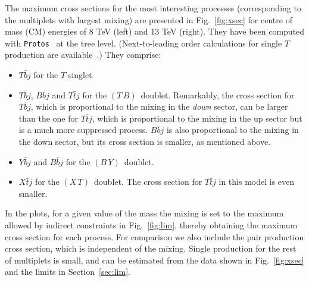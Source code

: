 \documentclass[12pt,a4paper]{article}
\newcommand{\xt}{$(X\,T)$}
\newcommand{\tb}{$(T\,B)$}
\newcommand{\by}{$(B\,Y)$}
\begin{document}
The maximum cross sections for the most interesting processes (corresponding to the multiplets with largest mixing) are presented in Fig.~\ref{fig:xsec} for centre of mass (CM) energies of 8 TeV (left) and 13 TeV (right). They have been computed with {\tt Protos}~\cite{AguilarSaavedra:2009es} at the tree level. (Next-to-leading order calculations for single $T$ production are available~\cite{Berger:2009qy,Campbell:2009gj}.) They comprise:
\begin{itemize}
\item $T \bar b j$ for the $T$ singlet
\item $T \bar b j$, $B \bar b j$ and $T \bar t j$ for the \tb\ doublet. Remarkably, the cross section for $T \bar b j$, which is proportional to the mixing in the {\it down} sector, can be larger than the one for $T \bar t j$, which is proportional to the mixing in the up sector but is a much more suppressed process. $B \bar b j$ is also proportional to the mixing in the down sector, but its cross section is smaller, as mentioned above.
\item $Y \bar b j$ and $B \bar b j$ for the \by\ doublet.
\item $X \bar t j$ for the \xt\ doublet. The cross section for $T \bar t j$ in this model is even smaller.
\end{itemize}
In the plots, for a given value of the mass the mixing is set to the maximum allowed by indirect constraints in Fig.~\ref{fig:lim}, thereby obtaining the maximum cross section for each process. For comparison we also include the pair production cross section, which is independent of the mixing. Single production for the rest of multiplets is small, and can be estimated from the data shown in Fig.~\ref{fig:xsec} and the limits in Section~\ref{sec:lim}.
\end{document}
